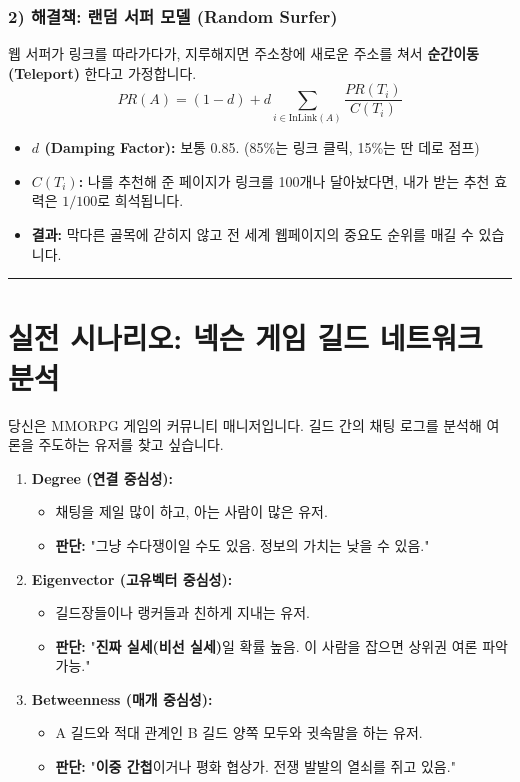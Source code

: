 \documentclass[11pt,a4paper]{book}
\theoremstyle{definition}
\begin{document}
\subsubsection*{2) 해결책: 랜덤 서퍼 모델 (Random Surfer)}
웹 서퍼가 링크를 따라가다가, 지루해지면 주소창에 새로운 주소를 쳐서 \textbf{순간이동(Teleport)} 한다고 가정합니다.
$$ PR(A) = (1-d) + d \sum_{i \in \text{InLink}(A)} \frac{PR(T_i)}{C(T_i)} $$
\begin{itemize}
    \item \textbf{$d$ (Damping Factor):} 보통 0.85. (85\%는 링크 클릭, 15\%는 딴 데로 점프)
    \item \textbf{$C(T_i)$:} 나를 추천해 준 페이지가 링크를 100개나 달아놨다면, 내가 받는 추천 효력은 $1/100$로 희석됩니다.
    \item \textbf{결과:} 막다른 골목에 갇히지 않고 전 세계 웹페이지의 중요도 순위를 매길 수 있습니다.
\end{itemize}

\vspace{0.5cm}\hrule\vspace{0.5cm}

\section{실전 시나리오: 넥슨 게임 길드 네트워크 분석}

\begin{storybox}[title={Scenario: 길드장과 숨은 실세 찾기}]
당신은 MMORPG 게임의 커뮤니티 매니저입니다. 길드 간의 채팅 로그를 분석해 여론을 주도하는 유저를 찾고 싶습니다.
\end{storybox}

\begin{enumerate}
    \item \textbf{Degree (연결 중심성):}
    \begin{itemize}
        \item 채팅을 제일 많이 하고, 아는 사람이 많은 유저.
        \item \textbf{판단:} "그냥 수다쟁이일 수도 있음. 정보의 가치는 낮을 수 있음."
    \end{itemize}
    \item \textbf{Eigenvector (고유벡터 중심성):}
    \begin{itemize}
        \item 길드장들이나 랭커들과 친하게 지내는 유저.
        \item \textbf{판단:} "\textbf{진짜 실세(비선 실세)}일 확률 높음. 이 사람을 잡으면 상위권 여론 파악 가능."
    \end{itemize}
    \item \textbf{Betweenness (매개 중심성):}
    \begin{itemize}
        \item A 길드와 적대 관계인 B 길드 양쪽 모두와 귓속말을 하는 유저.
        \item \textbf{판단:} "\textbf{이중 간첩}이거나 평화 협상가. 전쟁 발발의 열쇠를 쥐고 있음."
    \end{itemize}
\end{enumerate}
\end{document}
